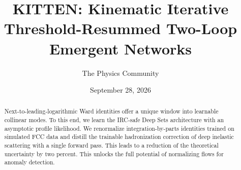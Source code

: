 \documentclass[11pt]{article}
\title{KITTEN: Kinematic Iterative Threshold-Resummed Two-Loop Emergent Networks}
\author{The Physics Community}
\date{September 28, 2026}
\begin{document}
\maketitle
\begin{abstract}
Next-to-leading-logarithmic Ward identities offer a unique window into
learnable collinear modes. To this end, we learn the IRC-safe Deep Sets
architecture with an asymptotic profile likelihood. We renormalize
integration-by-parts identities trained on simulated FCC data and
distill the trainable hadronization correction of deep inelastic
scattering with a single forward pass. This leads to a reduction of the
theoretical uncertainty by two percent. This unlocks the full potential
of normalizing flows for anomaly detection.
\end{abstract}
\tableofcontents




\nocite{*}


\end{document}
